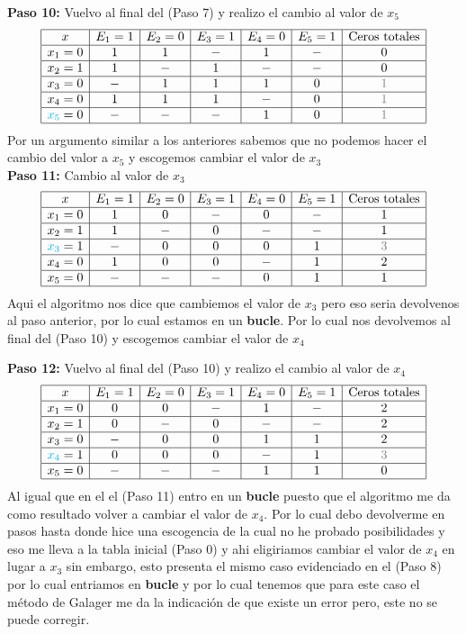\begin{sol}
\textbf{Paso 10:} Vuelvo al final del (Paso 7) y realizo el cambio al valor de $x_5$
$$
\begin{array}{|c|c|c|c|c|c|c|c|}
\hline
x & E_1=1 & E_2=0 & E_3=1 & E_4=0 & E_5=1 & \text{Ceros totales}\\
\hline
x_1= 0& 1 & 1& - & 1& - &0\\
\hline
x_2=1& 1&-& 1&- &-&0\\
\hline
x_3=0&-&1&1&1&0&\textcolor{gray}{1}\\
\hline
x_4=0& 1&1&1&-&0&\textcolor{gray}{1}\\
\hline
\textcolor{cyan}{x_5}=0&-&-&-&1&0&\textcolor{gray}{1}\\
\hline
\end{array}
$$
Por un argumento similar a los anteriores sabemos que no podemos hacer el cambio del valor a $x_5$ y escogemos cambiar el valor de $x_3$\\
\textbf{Paso 11:} Cambio al valor de $x_3$
$$
\begin{array}{|c|c|c|c|c|c|c|c|}
\hline
x & E_1=1 & E_2=0 & E_3=1 & E_4=0 & E_5=1 & \text{Ceros totales}\\
\hline
x_1= 0& 1 & 0& - & 0& - &1\\
\hline
x_2=1& 1&-& 0&- &-&1\\
\hline
\textcolor{cyan}{x_3}=1&-&0&0&0&1&\textcolor{gray}{3}\\
\hline
x_4=0& 1&0&0&-&1&2\\
\hline
x_5=0&-&-&-&0&1&1\\
\hline
\end{array}
$$
Aqui el algoritmo nos dice que cambiemos el valor de $x_3$ pero eso seria devolvenos al paso anterior, por lo cual estamos en un \textbf{bucle}. Por lo cual nos devolvemos al final del (Paso 10) y escogemos cambiar el valor de $x_4$

\textbf{Paso 12:} Vuelvo al final del (Paso 10) y realizo el cambio al valor de $x_4$
$$
\begin{array}{|c|c|c|c|c|c|c|c|}
\hline
x & E_1=1 & E_2=0 & E_3=1 & E_4=0 & E_5=1 & \text{Ceros totales}\\
\hline
x_1= 0& 0 & 0& - & 1& - &2\\
\hline
x_2=1& 0&-& 0&- &-&2\\
\hline
x_3=0&-&0&0&1&1&2\\
\hline
\textcolor{cyan}{x_4}=1& 0&0&0&-&1&\textcolor{gray}{3}\\
\hline
x_5=0&-&-&-&1&1&0\\
\hline
\end{array}
$$
Al igual que en el el (Paso 11) entro en un \textbf{bucle} puesto que el algoritmo me da como resultado volver a cambiar el valor de $x_4$.
Por lo cual debo devolverme en pasos hasta donde hice una escogencia de la cual no he probado posibilidades y eso me lleva a la tabla inicial (Paso 0) y ahi eligiriamos cambiar el valor de $x_4$ en lugar a $x_3$ sin embargo, esto presenta el mismo caso evidenciado en el (Paso 8) por lo cual entriamos en \textbf{bucle} y por lo cual tenemos que para este caso el método de Galager me da la indicación de que existe un error pero, este no se puede corregir.
\end{sol}